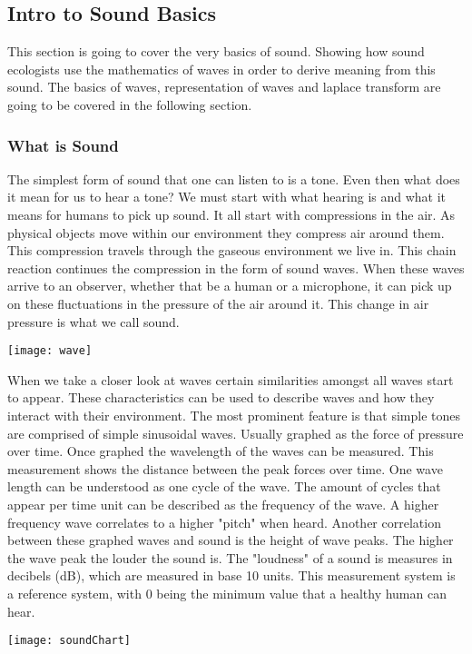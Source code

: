 \subsection{Intro to Sound Basics}
This section is going to cover the very basics of sound. Showing how sound ecologists use the mathematics of waves in order to derive meaning from this sound. The basics of waves, representation of waves and laplace transform are going to be covered in the following section.

\subsubsection{What is Sound}
The simplest form of sound that one can listen to is a tone. Even then what does it mean for us to hear a tone? We must start with what hearing is and what it means for humans to pick up sound. It all start with compressions in the air. As physical objects move within our environment they compress air around them. This compression travels through the gaseous environment we live in. This chain reaction continues the compression in the form of sound waves. When these waves arrive to an observer, whether that be a human or a microphone, it can pick up on these fluctuations in the pressure of the air around it. This change in air pressure is what we call sound.
\begin{center}
  \texttt{[image: wave]} \\[12pt]
\end{center}
\cite{villanueva}
When we take a closer look at waves certain similarities amongst all waves start to appear. These characteristics can be used to describe waves and how they interact with their environment. The most prominent feature is that simple tones are comprised of simple sinusoidal waves. Usually graphed as the force of pressure over time. Once graphed the wavelength of the waves can be measured. This measurement shows the distance between the peak forces over time. One wave length can be understood as one cycle of the wave. The amount of cycles that appear per time unit can be described as the frequency of the wave. A higher frequency wave correlates to a higher "pitch" when heard. Another correlation between these graphed waves and sound is the height of wave peaks. The higher the wave peak the louder the sound is. The "loudness" of a sound is measures in decibels (dB), which are measured in base 10 units. This measurement system is a reference system, with 0 being the minimum value that a healthy human can hear.\cite{villanueva}
\begin{center}
  \texttt{[image: soundChart]} \\[12pt]
	\cite{sound}
\end{center}

